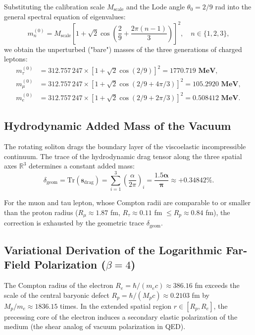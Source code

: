 \documentclass[12pt,a4paper]{article}
\begin{document}
	Substituting the calibration scale $M_{\text{scale}}$ and the Lode angle $\theta_0 = 2/9$ rad into the general spectral equation of eigenvalues:
	\begin{equation}
	m_n^{(0)} = M_{\text{scale}} \left[ 1 + \sqrt{2} \cos\left( \frac{2}{9} + \frac{2\pi(n-1)}{3} \right) \right]^2, \quad n \in \{1, 2, 3\},
	\end{equation}
	we obtain the unperturbed ("bare") masses of the three generations of charged leptons:
	\begin{align}
	m_\tau^{(0)} &= 312.757\,247 \times \left[ 1 + \sqrt{2} \cos(2/9) \right]^2 = \mathbf{1770.719 \text{ MeV}}, \\
	m_\mu^{(0)}  &= 312.757\,247 \times \left[ 1 + \sqrt{2} \cos(2/9 + 4\pi/3) \right]^2 = \mathbf{105.2920 \text{ MeV}}, \\
	m_e^{(0)}    &= 312.757\,247 \times \left[ 1 + \sqrt{2} \cos(2/9 + 2\pi/3) \right]^2 = \mathbf{0.508412 \text{ MeV}}.
	\end{align}
			
	\subsection{Hydrodynamic Added Mass of the Vacuum}
	The rotating soliton drags the boundary layer of the viscoelastic incompressible continuum. The trace of the hydrodynamic drag tensor along the three spatial axes $\mathbb{R}^3$ determines a constant added mass:
	\begin{equation}
	\delta_{\text{geom}} = \mathrm{Tr}(\mathbf{s}_{\text{drag}}) = \sum_{i=1}^3 \left(\frac{\alpha}{2\pi}\right)_i = \mathbf{\frac{1.5 \alpha}{\pi}} \approx \mathbf{+0.34842\%}.
	\end{equation}
			
	For the muon and tau lepton, whose Compton radii are comparable to or smaller than the proton radius ($R_\mu \approx 1.87$ fm, $R_\tau \approx 0.11$ fm $\le R_p \approx 0.84$ fm), the correction is exhausted by the geometric trace $\delta_{\text{geom}}$.
			
	
	\subsection{Variational Derivation of the Logarithmic Far-Field Polarization ($\beta = 4$)}
	The Compton radius of the electron $R_e = \hbar / (m_e c) \approx 386.16$ fm exceeds the scale of the central baryonic defect $R_p = \hbar / (M_p c) \approx 0.2103$ fm by $M_p/m_e \approx 1836.15$ times. In the extended spatial region $r \in [R_p, R_e]$, the precessing core of the electron induces a secondary elastic polarization of the medium (the shear analog of vacuum polarization in QED).
			
\end{document}
